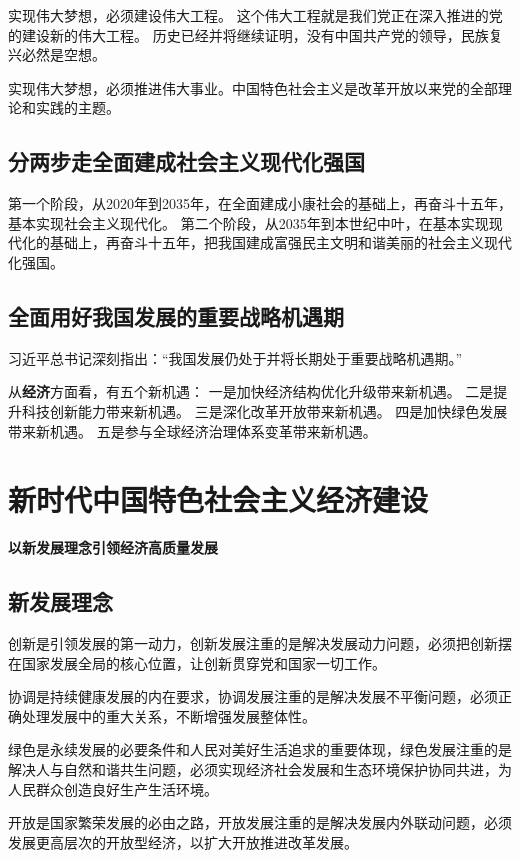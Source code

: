 \documentclass[a4paper, UTF8]{ctexart}
\begin{document}
    实现伟大梦想，必须建设伟大工程。
    这个伟大工程就是我们党正在深入推进的党的建设新的伟大工程。
    历史已经并将继续证明，没有中国共产党的领导，民族复兴必然是空想。
    
    实现伟大梦想，必须推进伟大事业。中国特色社会主义是改革开放以来党的全部理论和实践的主题。

    \subsection{分两步走全面建成社会主义现代化强国}
    第一个阶段，从2020年到2035年，在全面建成小康社会的基础上，再奋斗十五年，基本实现社会主义现代化。
    第二个阶段，从2035年到本世纪中叶，在基本实现现代化的基础上，再奋斗十五年，把我国建成富强民主文明和谐美丽的社会主义现代化强国。

    \subsection{全面用好我国发展的重要战略机遇期}
    习近平总书记深刻指出：“我国发展仍处于并将长期处于重要战略机遇期。”

    从\textbf{经济}方面看，有五个新机遇：
    一是加快经济结构优化升级带来新机遇。
    二是提升科技创新能力带来新机遇。
    三是深化改革开放带来新机遇。
    四是加快绿色发展带来新机遇。
    五是参与全球经济治理体系变革带来新机遇。

\section{新时代中国特色社会主义经济建设}
    \textbf{以新发展理念引领经济高质量发展}

    \subsection{新发展理念}
    创新是引领发展的第一动力，创新发展注重的是解决发展动力问题，必须把创新摆在国家发展全局的核心位置，让创新贯穿党和国家一切工作。

    协调是持续健康发展的内在要求，协调发展注重的是解决发展不平衡问题，必须正确处理发展中的重大关系，不断增强发展整体性。

    绿色是永续发展的必要条件和人民对美好生活追求的重要体现，绿色发展注重的是解决人与自然和谐共生问题，必须实现经济社会发展和生态环境保护协同共进，为人民群众创造良好生产生活环境。

    开放是国家繁荣发展的必由之路，开放发展注重的是解决发展内外联动问题，必须发展更高层次的开放型经济，以扩大开放推进改革发展。
\end{document}
